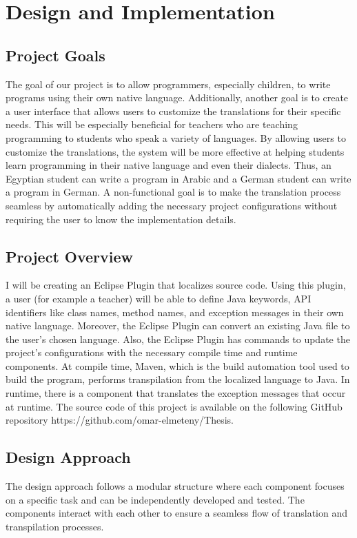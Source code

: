 \chapter{Design and Implementation}
\section{Project Goals}
The goal of our project is to allow programmers, especially children, to write programs using their own native language. Additionally, another goal is to create a user interface that allows users to customize the translations for their specific needs. This will be especially beneficial for teachers who are teaching programming to students who speak a variety of languages. By allowing users to customize the translations, the system will be more effective at helping students learn programming in their native language and even their dialects. Thus, an Egyptian student can write a program in Arabic and a German student can write a program in German. A non-functional goal is to make the translation process seamless by automatically adding the necessary project configurations without requiring the user to know the implementation details.
\section{Project Overview}
I will be creating an Eclipse Plugin that localizes source code. Using this plugin, a user (for example a teacher) will be able to define Java keywords, \ac{API} identifiers like class names, method names, and exception messages in their own native language. Moreover, the Eclipse Plugin can convert an existing Java file to the user's chosen language. Also, the Eclipse Plugin has commands to update the project's configurations with the necessary compile time and runtime components. At compile time, Maven, which is the build automation tool used to build the program, performs transpilation from the localized language to Java. In runtime, there is a component that translates the exception messages that occur at runtime. The source code of this project is available on the following GitHub repository https://github.com/omar-elmeteny/Thesis.
\section{Design Approach}
The design approach follows a modular structure where each component focuses on a specific task and can be independently developed and tested. The components interact with each other to ensure a seamless flow of translation and transpilation processes.

